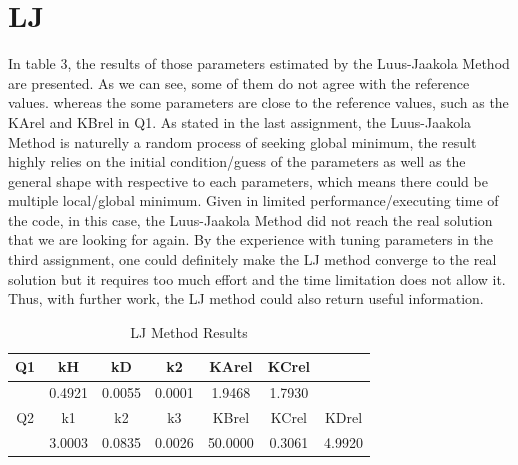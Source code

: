 \documentclass[a4paper,12pt]{article} %
\begin{document}
\section*{LJ}
In table 3, the results of those parameters estimated by the Luus-Jaakola Method are presented. As we can see, some of them do not agree with
the reference values. whereas the some parameters are close to the reference values, such as the KArel and KBrel in Q1. As stated in the last assignment, the Luus-Jaakola Method is naturelly a random process of seeking global 
minimum, the result highly relies on the initial condition/guess of the parameters as well as the general shape with respective to each parameters,
which means there could be multiple local/global minimum. 
Given in limited performance/executing time of the code, in this case, the Luus-Jaakola Method did not reach the real 
solution that we are looking for again. By the experience with tuning parameters in the third assignment, one could definitely
make the LJ method converge to the real solution but it requires too much effort and the time limitation does not allow it. 
Thus, with further work, the LJ method could also return useful information.
\begin{table}[ht]
    \caption{LJ Method Results}
    \centering
    \begin{tabular}{|c|c|c|c|c|c|c|}
        \hline
        Q1 &  kH & kD& k2& KArel& KCrel & \\
        \hline   
        &  0.4921&  0.0055&  0.0001&  1.9468&  1.7930&  \\
        \hline
        Q2 & k1 & k2 & k3 & KBrel & KCrel & KDrel\\
        \hline
        & 3.0003&0.0835& 0.0026&50.0000& 0.3061& 4.9920 \\
        \hline
    \end{tabular}
\end{table}
\end{document}
